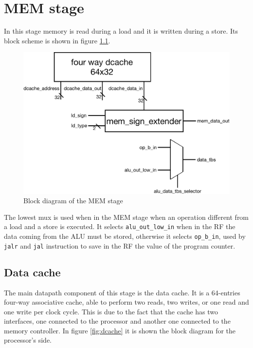 \chapter{MEM stage}
\label{chap:mem}

In this stage memory is read during a load and it is written during a store. Its block scheme is shown in figure \ref{fig:MEM_stage}.

\begin{figure}[!ht]
	\centering
	\includegraphics[width=.7\linewidth]{./chapters/figures/MEM_stage.pdf}
	\caption{Block diagram of the MEM stage}
	\label{fig:MEM_stage}
\end{figure}

The lowest mux is used when in the MEM stage when an operation different from a load and a store is executed. It selects \verb|alu_out_low_in| when in the RF the data coming from the ALU
must be stored, otherwise it selects \verb|op_b_in|, used by \verb|jalr| and \verb|jal| instruction to save in the RF the value of the program counter.

\section{Data cache}

The main datapath component of this stage is the data cache. It is a 64-entries four-way associative cache, able to perform two reads, two writes, or one read and one write per clock cycle.
This is due to the fact that the cache has two interfaces, one connected to the processor and another one connected to the memory controller. In figure \ref{fig:dcache} it is shown
the block diagram for the processor's side.

